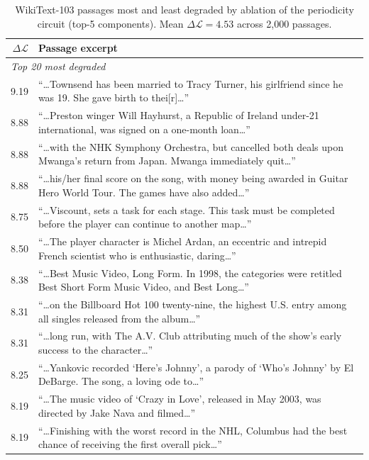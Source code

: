 \documentclass{article}
\begin{document}
\begin{table}[h]
\centering
\caption{WikiText-103 passages most and least degraded by ablation of the periodicity circuit (top-5 components). Mean $\Delta\mathcal{L} = 4.53$ across 2{,}000 passages.}
\label{tab:wiki_full}
\small
\begin{tabularx}{\textwidth}{r >{\raggedright\arraybackslash}X}
\toprule
$\Delta\mathcal{L}$ & Passage excerpt \\
\midrule
\multicolumn{2}{l}{\emph{Top 20 most degraded}} \\
9.19 & ``\ldots Townsend has been married to Tracy Turner, his girlfriend since he was 19. She gave birth to thei[r]\ldots'' \\
8.88 & ``\ldots Preston winger Will Hayhurst, a Republic of Ireland under-21 international, was signed on a one-month loan\ldots'' \\
8.88 & ``\ldots with the NHK Symphony Orchestra, but cancelled both deals upon Mwanga's return from Japan. Mwanga immediately quit\ldots'' \\
8.88 & ``\ldots his/her final score on the song, with money being awarded in Guitar Hero World Tour. The games have also added\ldots'' \\
8.75 & ``\ldots Viscount, sets a task for each stage. This task must be completed before the player can continue to another map\ldots'' \\
8.50 & ``\ldots The player character is Michel Ardan, an eccentric and intrepid French scientist who is enthusiastic, daring\ldots'' \\
8.38 & ``\ldots Best Music Video, Long Form. In 1998, the categories were retitled Best Short Form Music Video, and Best Long\ldots'' \\
8.31 & ``\ldots on the Billboard Hot 100 twenty-nine, the highest U.S. entry among all singles released from the album\ldots'' \\
8.31 & ``\ldots long run, with The A.V. Club attributing much of the show's early success to the character\ldots'' \\
8.25 & ``\ldots Yankovic recorded `Here's Johnny', a parody of `Who's Johnny' by El DeBarge. The song, a loving ode to\ldots'' \\
8.19 & ``\ldots The music video of `Crazy in Love', released in May 2003, was directed by Jake Nava and filmed\ldots'' \\
8.19 & ``\ldots Finishing with the worst record in the NHL, Columbus had the best chance of receiving the first overall pick\ldots'' \\

\end{tabularx}
\end{table}
\end{document}
